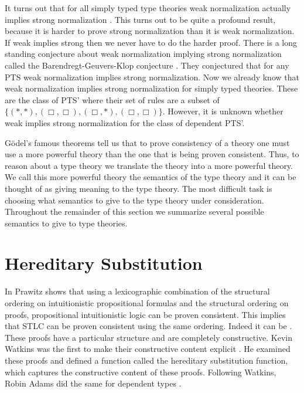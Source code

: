 It turns out that for all simply typed type theories weak
normalization actually implies strong normalization
\cite{Sorensen:1997}.  This turns out to be quite a profound result,
because it is harder to prove strong normalization than it is weak
normalization.  If weak implies strong then we never have to do the
harder proof.  There is a long standing conjecture about weak
normalization implying strong normalization called the
Barendregt-Geuvers-Klop conjecture \cite{Sorensen:2006}.  They
conjectured that for any PTS weak normalization implies strong
normalization.  Now we already know that weak normalization implies
strong normalization for simply typed theories.  These are the class
of PTS' where their set of rules are a subset of
$\{(*,*),(\Box,\Box),(\Box,*),(\Box,\Box)\}$.  However, it is unknown
whether weak implies strong normalization for the class of dependent
PTS'.

G\"odel's famous theorems tell us that to prove consistency of a
theory one must use a more powerful theory than the one that is being
proven consistent.  Thus, to reason about a type theory we translate
the theory into a more powerful theory.  We call this more powerful
theory the semantics of the type theory and it can be thought of as
giving meaning to the type theory.  The most difficult task is
choosing what semantics to give to the type theory under
consideration.  Throughout the remainder of this section we summarize
several possible semantics to give to type theories.  

\section{Hereditary Substitution}
\label{sec:hereditary_substitution}
In \cite{Prawitz:1965} Prawitz shows that using a lexicographic
combination of the structural ordering on intuitionistic propositional
formulas and the structural ordering on proofs, propositional
intuitionistic logic can be proven consistent.  This implies that STLC
can be proven consistent using the same ordering.  Indeed it can be
\cite{Girard:1989,Amadio:1998,Levy:1976}.  These proofs have a
particular structure and are completely constructive.  Kevin Watkins
was the first to make their constructive content explicit
\cite{Watkins:2004}.  He examined these proofs and defined a function
called the hereditary substitution function, which captures the
constructive content of these proofs.  Following Watkins, Robin Adams
did the same for dependent types \cite{Adams:2004}.

